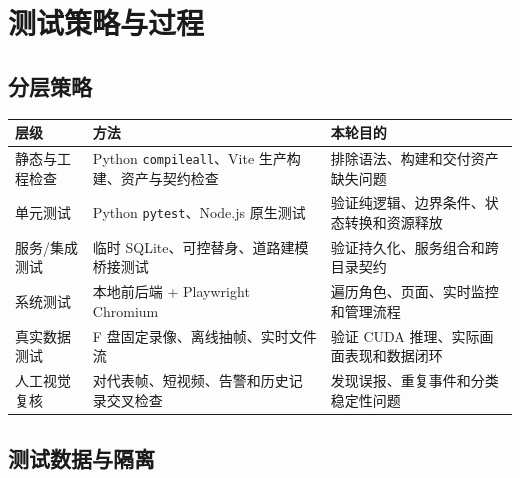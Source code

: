 \section{测试策略与过程}\label{test-ux6d4bux8bd5ux7b56ux7565ux4e0eux8fc7ux7a0b}

\subsection{分层策略}\label{test-ux5206ux5c42ux7b56ux7565}

\begin{longtable}[]{@{}
  >{\raggedright\arraybackslash}p{}
  >{\raggedright\arraybackslash}p{}
  >{\raggedright\arraybackslash}p{}@{}}
\toprule\noalign{}
\begin{minipage}[b]{\linewidth}\raggedright
层级
\end{minipage} & \begin{minipage}[b]{\linewidth}\raggedright
方法
\end{minipage} & \begin{minipage}[b]{\linewidth}\raggedright
本轮目的
\end{minipage} \\
\midrule\noalign{}
\endhead
\bottomrule\noalign{}
\endlastfoot
静态与工程检查 & Python \texttt{compileall}、Vite 生产构建、资产与契约检查 & 排除语法、构建和交付资产缺失问题 \\
单元测试 & Python \texttt{pytest}、Node.js 原生测试 & 验证纯逻辑、边界条件、状态转换和资源释放 \\
服务/集成测试 & 临时 SQLite、可控替身、道路建模桥接测试 & 验证持久化、服务组合和跨目录契约 \\
系统测试 & 本地前后端 + Playwright Chromium & 遍历角色、页面、实时监控和管理流程 \\
真实数据测试 & F 盘固定录像、离线抽帧、实时文件流 & 验证 CUDA 推理、实际画面表现和数据闭环 \\
人工视觉复核 & 对代表帧、短视频、告警和历史记录交叉检查 & 发现误报、重复事件和分类稳定性问题 \\
\end{longtable}

\subsection{测试数据与隔离}\label{test-ux6d4bux8bd5ux6570ux636eux4e0eux9694ux79bb}

